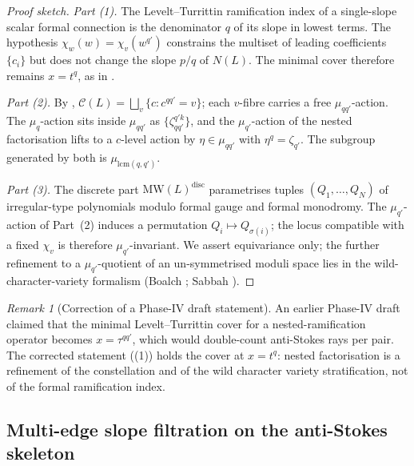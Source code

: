 \documentclass[11pt,a4paper]{article}
\theoremstyle{plain}
\theoremstyle{definition}
\theoremstyle{remark}
\newtheorem{remark}[theorem]{Remark}
\newcommand{\NL}{N(L)}
\newcommand{\Cl}{\mathcal{C}}
\newcommand{\MW}{\mathrm{MW}}
\begin{document}
\begin{proof}[Proof sketch]
\textit{Part (1).} The Levelt--Turrittin ramification index of a single-slope
scalar formal connection is the denominator $q$ of its slope in lowest
terms. The hypothesis $\chi_w(w) = \chi_v(w^{q'})$ constrains the
multiset of leading coefficients $\{c_i\}$ but does not change the slope
$p/q$ of $\NL$. The minimal cover therefore remains $x = t^q$, as in
.

\textit{Part (2).} By , $\Cl(L) = \bigsqcup_v \{c : c^{qq'}
= v\}$; each $v$-fibre carries a free $\mu_{qq'}$-action. The
$\mu_q$-action sits inside $\mu_{qq'}$ as $\{\zeta_{qq'}^{q'k}\}$, and the
$\mu_{q'}$-action of the nested factorisation lifts to a $c$-level action
by $\eta \in \mu_{qq'}$ with $\eta^q = \zeta_{q'}$. The subgroup generated
by both is $\mu_{\mathrm{lcm}(q, q')}$.

\textit{Part (3).} The discrete part $\MW(L)^{\mathrm{disc}}$
parametrises tuples $(Q_1, \dots, Q_N)$ of irregular-type polynomials
modulo formal gauge and formal monodromy. The $\mu_{q'}$-action of
Part~(2) induces a permutation $Q_i \mapsto Q_{\sigma(i)}$; the locus
compatible with a fixed $\chi_v$ is therefore $\mu_{q'}$-invariant. We
assert equivariance only; the further refinement to a $\mu_{q'}$-quotient
of an un-symmetrised moduli space lies in the wild-character-variety
formalism (Boalch \cite{boalch-stokes,boalch-wildhodge}; Sabbah
\cite{sabbah-polarizable}).
\end{proof}

\begin{remark}[Correction of a Phase-IV draft statement]\label{rem:AT3-correction}
An earlier Phase-IV draft claimed that the minimal Levelt--Turrittin cover
for a nested-ramification operator becomes $x = \tau^{qq'}$, which would
double-count anti-Stokes rays per pair. The corrected statement
((1)) holds the cover at $x = t^q$: nested factorisation is
a refinement of the constellation and of the wild character variety
stratification, not of the formal ramification index.
\end{remark}

\subsection{Multi-edge slope filtration on the anti-Stokes skeleton}\label{ssec:AT5}
\end{document}
